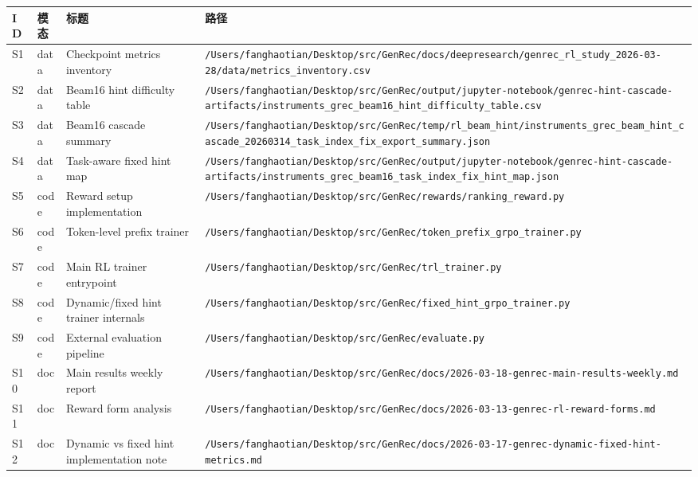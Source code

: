 \documentclass[a4paper]{article}
\begin{document}
\scriptsize
\begin{longtable}{p{1cm}p{1.3cm}p{4.0cm}p{8.0cm}}
\toprule
ID & 模态 & 标题 & 路径 \\
\midrule
\endhead
S1 & data & Checkpoint metrics inventory & \texttt{/Users/fanghaotian/Desktop/src/GenRec/docs/deepresearch/genrec\_rl\_study\_2026-03-28/data/metrics\_inventory.csv} \\
S2 & data & Beam16 hint difficulty table & \texttt{/Users/fanghaotian/Desktop/src/GenRec/output/jupyter-notebook/genrec-hint-cascade-artifacts/instruments\_grec\_beam16\_hint\_difficulty\_table.csv} \\
S3 & data & Beam16 cascade summary & \texttt{/Users/fanghaotian/Desktop/src/GenRec/temp/rl\_beam\_hint/instruments\_grec\_beam\_hint\_cascade\_20260314\_task\_index\_fix\_export\_summary.json} \\
S4 & data & Task-aware fixed hint map & \texttt{/Users/fanghaotian/Desktop/src/GenRec/output/jupyter-notebook/genrec-hint-cascade-artifacts/instruments\_grec\_beam16\_task\_index\_fix\_hint\_map.json} \\
S5 & code & Reward setup implementation & \texttt{/Users/fanghaotian/Desktop/src/GenRec/rewards/ranking\_reward.py} \\
S6 & code & Token-level prefix trainer & \texttt{/Users/fanghaotian/Desktop/src/GenRec/token\_prefix\_grpo\_trainer.py} \\
S7 & code & Main RL trainer entrypoint & \texttt{/Users/fanghaotian/Desktop/src/GenRec/trl\_trainer.py} \\
S8 & code & Dynamic/fixed hint trainer internals & \texttt{/Users/fanghaotian/Desktop/src/GenRec/fixed\_hint\_grpo\_trainer.py} \\
S9 & code & External evaluation pipeline & \texttt{/Users/fanghaotian/Desktop/src/GenRec/evaluate.py} \\
S10 & doc & Main results weekly report & \texttt{/Users/fanghaotian/Desktop/src/GenRec/docs/2026-03-18-genrec-main-results-weekly.md} \\
S11 & doc & Reward form analysis & \texttt{/Users/fanghaotian/Desktop/src/GenRec/docs/2026-03-13-genrec-rl-reward-forms.md} \\
S12 & doc & Dynamic vs fixed hint implementation note & \texttt{/Users/fanghaotian/Desktop/src/GenRec/docs/2026-03-17-genrec-dynamic-fixed-hint-metrics.md} \\
\bottomrule
\end{longtable}
\end{document}
